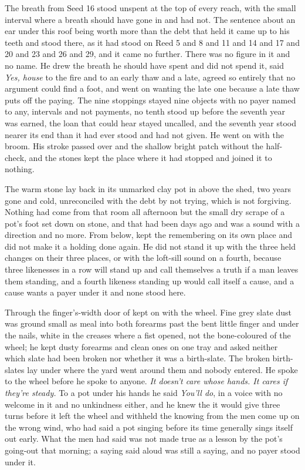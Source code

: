The breath from Seed 16 stood unspent at the top of every reach, with the small interval where a breath should have gone in and had not. The sentence about an ear under this roof being worth more than the debt that held it came up to his teeth and stood there, as it had stood on Reed 5 and 8 and 11 and 14 and 17 and 20 and 23 and 26 and 29, and it came no further. There was no figure in it and no name. He drew the breath he should have spent and did not spend it, said \emph{Yes, house} to the fire and to an early thaw and a late, agreed so entirely that no argument could find a foot, and went on wanting the late one because a late thaw puts off the paying. The nine stoppings stayed nine objects with no payer named to any, intervals and not payments, no tenth stood up before the seventh year was earned, the loan that could hear stayed uncalled, and the seventh year stood nearer its end than it had ever stood and had not given. He went on with the broom. His stroke passed over  and the shallow bright patch without the half-check, and the stones kept the place where it had stopped and joined it to nothing.

\scenebreak

The warm stone lay back in its unmarked clay pot in  above the shed, two years gone and cold, unreconciled with the debt by not trying, which is not forgiving. Nothing had come from that room all afternoon but the small dry scrape of a pot's foot set down on stone, and that had been days ago and was a sound with a direction and no more. From below,  kept the remembering on its own place and did not make it a holding done again. He did not stand it up with the three held changes on their three places, or with the loft-sill sound on a fourth, because three likenesses in a row will stand up and call themselves a truth if a man leaves them standing, and a fourth likeness standing up would call itself a cause, and a cause wants a payer under it and none stood here.

Through the finger's-width door of   kept on with the wheel. Fine grey slate dust was ground small as meal into both forearms past the bent little finger and under the nails, white in the creases where a fist opened, not the bone-coloured  of the wheel; he kept dusty forearms and clean ones on one tray and asked neither which slate had been broken nor whether it was a birth-slate. The broken birth-slates lay under  where the yard went around them and nobody entered. He spoke to the wheel before he spoke to anyone. \emph{It doesn't care whose hands. It cares if they're steady.} To a pot under his hands he said \emph{You'll do}, in a voice with no welcome in it and no unkindness either, and he knew the  it would give three turns before it left the wheel and withheld the knowing from the men come up on the wrong wind, who had said a pot singing before its time generally sings itself out early. What the men had said was not made true as a lesson by the pot's going-out that morning; a saying said aloud was still a saying, and no payer stood under it.

